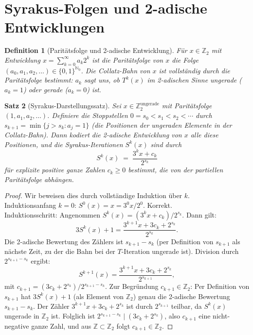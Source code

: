 \documentclass[12pt,a4paper]{article}
\newtheorem{theorem}{Satz}[section]
\newtheorem{definition}[theorem]{Definition}
\begin{document}
\section{Syrakus-Folgen und 2-adische Entwicklungen}\label{sec:syrakus}

\begin{definition}[Paritätsfolge und 2-adische Entwicklung]\label{def:parität}
Für $x \in \mathbb{Z}_2$ mit Entwicklung $x = \sum_{k=0}^\infty a_k 2^k$ ist die
\emph{Paritätsfolge} von $x$ die Folge $(a_0, a_1, a_2, \ldots) \in \{0,1\}^{\mathbb{N}_0}$.
Die Collatz-Bahn von $x$ ist vollständig durch die Paritätsfolge bestimmt:
$a_k$ sagt uns, ob $T^k(x)$ im 2-adischen Sinne ungerade ($a_k = 1$) oder gerade ($a_k = 0$) ist.
\end{definition}

\begin{theorem}[Syrakus-Darstellungssatz]\label{thm:syrakus_darst}
Sei $x \in \mathbb{Z}_2^{\text{ungerade}}$ mit Paritätsfolge $(1, a_1, a_2, \ldots)$.
Definiere die Stoppstellen $0 = s_0 < s_1 < s_2 < \cdots$ durch
$s_{k+1} = \min\{j > s_k : a_j = 1\}$
(die Positionen der ungeraden Elemente in der Collatz-Bahn).
Dann kodiert die 2-adische Entwicklung von $x$ alle diese Positionen, und die
Syrakus-Iterationen $S^k(x)$ sind durch
\[
  S^k(x) \;=\; \frac{3^k x + c_k}{2^{s_k}}
\]
für explizite positive ganze Zahlen $c_k \geq 0$ bestimmt, die von der partiellen
Paritätsfolge abhängen.
\end{theorem}

\begin{proof}
Wir beweisen dies durch vollständige Induktion über $k$.\\
Induktionsanfang $k=0$: $S^0(x) = x = 3^0 x / 2^0$. Korrekt.\\
Induktionsschritt: Angenommen $S^k(x) = (3^k x + c_k)/2^{s_k}$. Dann gilt:
\[
  3 S^k(x) + 1 = \frac{3^{k+1} x + 3c_k + 2^{s_k}}{2^{s_k}}.
\]
Die 2-adische Bewertung des Zählers ist $s_{k+1} - s_k$ (per Definition von $s_{k+1}$
als nächste Zeit, zu der die Bahn bei der $T$-Iteration ungerade ist). Division durch
$2^{s_{k+1}-s_k}$ ergibt:
\[
  S^{k+1}(x) = \frac{3^{k+1} x + 3c_k + 2^{s_k}}{2^{s_{k+1}}},
\]
mit $c_{k+1} = (3c_k + 2^{s_k})/2^{s_{k+1}-s_k}$.
Zur Begr\"undung $c_{k+1} \in \mathbb{Z}_2$: Per Definition von $s_{k+1}$
hat $3S^k(x)+1$ (als Element von $\mathbb{Z}_2$) genau die 2-adische Bewertung
$s_{k+1} - s_k$. Der Z\"ahler $3^{k+1}x + 3c_k + 2^{s_k}$ ist durch
$2^{s_{k+1}}$ teilbar, da $S^k(x)$ ungerade in $\mathbb{Z}_2$ ist.
Folglich ist $2^{s_{k+1}-s_k} \mid (3c_k + 2^{s_k})$, also $c_{k+1}$
eine nicht-negative ganze Zahl, und aus $\mathbb{Z} \subset \mathbb{Z}_2$
folgt $c_{k+1} \in \mathbb{Z}_2$.
\end{proof}
\end{document}
